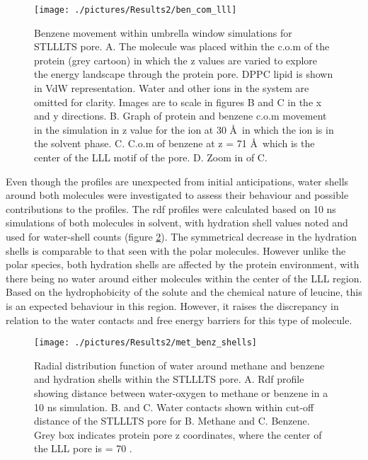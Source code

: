 \begin{figure}[H]
\begin{center}
\texttt{[image: ./pictures/Results2/ben\_com\_lll]}
\caption[Benzene movement within umbrella window simulations for STLLLTS pore.] {Benzene movement within umbrella window simulations for STLLLTS pore. A. The molecule was placed within the c.o.m of the protein (grey cartoon) in which the z values are varied to explore the energy landscape through the protein pore. DPPC lipid is shown in VdW representation. Water and other ions in the system are omitted for clarity. Images are to scale in figures B and C in the x and y directions. B. Graph of protein and benzene c.o.m movement in the simulation in z value for the ion at 30 \AA\, in which the ion is in the solvent phase. C. C.o.m of benzene at z = 71 \AA\ which is the center of the LLL motif of the pore. D. Zoom in of C.} %
\label{fig:ben_com_lll}
\end{center}
\end{figure}


Even though the profiles are unexpected from initial anticipations, water shells around both molecules were investigated to assess their behaviour and possible contributions to the profiles. The rdf profiles were calculated based on 10 ns simulations of both molecules in solvent, with hydration shell values noted and used for water-shell counts (figure \ref{fig:met_benz_shells}). The symmetrical decrease in the hydration shells is comparable to that seen with the polar molecules. However unlike the polar species, both hydration shells are affected by the protein environment, with there being no water around either molecules within the center of the LLL region. Based on the hydrophobicity of the solute and the chemical nature of leucine, this is an expected behaviour in this region. However, it raises the discrepancy in  relation to the water contacts and free energy barriers for this type of molecule. 

\begin{figure}[H]
\begin{center}
\texttt{[image: ./pictures/Results2/met\_benz\_shells]}
\caption[Radial distribution function of water around methane and benzene and hydration shells within the STLLLTS pore.] {Radial distribution function of water around methane and benzene and hydration shells within the STLLLTS pore. A. Rdf profile showing distance between water-oxygen to methane or benzene in a 10 ns simulation. B. and C. Water contacts shown within cut-off distance of the STLLLTS pore for B. Methane and C. Benzene. Grey box indicates protein pore z coordinates, where the center of the LLL pore is = 70 \angstrom.} 
\label{fig:met_benz_shells}
\end{center}
\end{figure}

